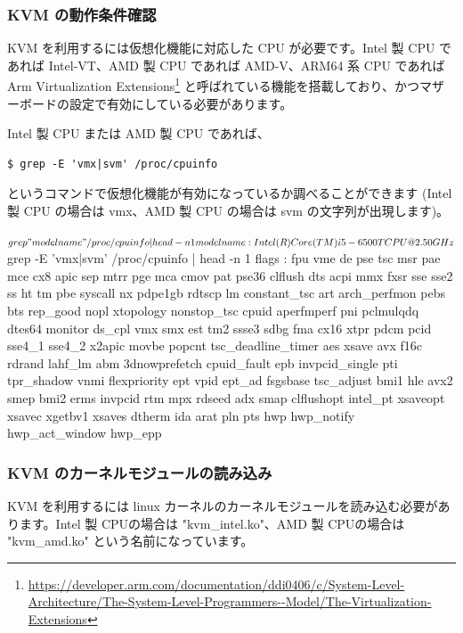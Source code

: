 \documentclass[mingoth,a4paper]{jsarticle}
\begin{document}
\subsubsection{KVM の動作条件確認}

KVM を利用するには仮想化機能に対応した CPU が必要です。Intel 製 CPU であれば Intel-VT、AMD 製 CPU であれば AMD-V、ARM64 系 CPU であれば Arm Virtualization Extensions\footnote{\url{https://developer.arm.com/documentation/ddi0406/c/System-Level-Architecture/The-System-Level-Programmers--Model/The-Virtualization-Extensions}} と呼ばれている機能を搭載しており、かつマザーボードの設定で有効にしている必要があります。

Intel 製 CPU または AMD 製 CPU であれば、

\begin{verbatim}$ grep -E 'vmx|svm' /proc/cpuinfo\end{verbatim}

というコマンドで仮想化機能が有効になっているか調べることができます (Intel 製 CPU の場合は vmx、AMD 製 CPU の場合は svm の文字列が出現します)。

\begin{commandline}
$ grep "model name" /proc/cpuinfo | head -n 1
model name      : Intel(R) Core(TM) i5-6500T CPU @ 2.50GHz
  
$ grep -E 'vmx|svm' /proc/cpuinfo | head -n 1
flags           : fpu vme de pse tsc msr pae mce cx8 apic sep mtrr pge mca cmov pat pse36 clflush dts acpi
mmx fxsr sse sse2 ss ht tm pbe syscall nx pdpe1gb rdtscp lm constant_tsc art arch_perfmon pebs bts rep_good
nopl xtopology nonstop_tsc cpuid aperfmperf pni pclmulqdq dtes64 monitor ds_cpl vmx smx est tm2 ssse3 sdbg
fma cx16 xtpr pdcm pcid sse4_1 sse4_2 x2apic movbe popcnt tsc_deadline_timer aes xsave avx f16c rdrand lahf_lm
abm 3dnowprefetch cpuid_fault epb invpcid_single pti tpr_shadow vnmi flexpriority ept vpid ept_ad fsgsbase
tsc_adjust bmi1 hle avx2 smep bmi2 erms invpcid rtm mpx rdseed adx smap clflushopt intel_pt xsaveopt xsavec
xgetbv1 xsaves dtherm ida arat pln pts hwp hwp_notify hwp_act_window hwp_epp
\end{commandline}

\subsubsection{KVM のカーネルモジュールの読み込み}

KVM を利用するには linux カーネルのカーネルモジュールを読み込む必要があります。Intel 製 CPUの場合は "kvm\_intel.ko"、AMD 製 CPUの場合は "kvm\_amd.ko" という名前になっています。
\end{document}
